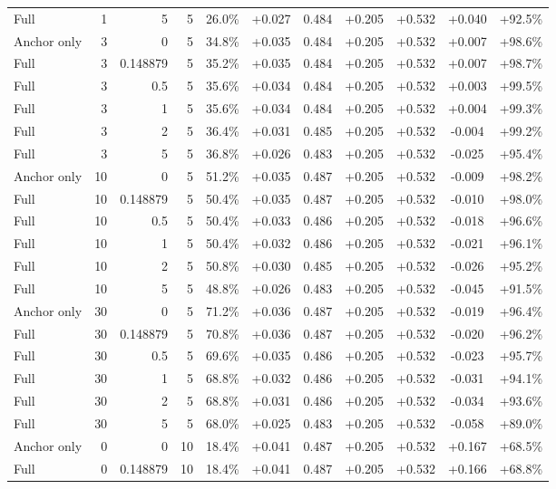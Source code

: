 \begin{table}[htbp]
\begin{tabular}{lrrrccccccc}
Full & 1 & 5 & 5 & 26.0\% & +0.027 & 0.484 & +0.205 & +0.532 & +0.040 & +92.5\% \\
Anchor only & 3 & 0 & 5 & 34.8\% & +0.035 & 0.484 & +0.205 & +0.532 & +0.007 & +98.6\% \\
Full & 3 & 0.148879 & 5 & 35.2\% & +0.035 & 0.484 & +0.205 & +0.532 & +0.007 & +98.7\% \\
Full & 3 & 0.5 & 5 & 35.6\% & +0.034 & 0.484 & +0.205 & +0.532 & +0.003 & +99.5\% \\
Full & 3 & 1 & 5 & 35.6\% & +0.034 & 0.484 & +0.205 & +0.532 & +0.004 & +99.3\% \\
Full & 3 & 2 & 5 & 36.4\% & +0.031 & 0.485 & +0.205 & +0.532 & -0.004 & +99.2\% \\
Full & 3 & 5 & 5 & 36.8\% & +0.026 & 0.483 & +0.205 & +0.532 & -0.025 & +95.4\% \\
Anchor only & 10 & 0 & 5 & 51.2\% & +0.035 & 0.487 & +0.205 & +0.532 & -0.009 & +98.2\% \\
Full & 10 & 0.148879 & 5 & 50.4\% & +0.035 & 0.487 & +0.205 & +0.532 & -0.010 & +98.0\% \\
Full & 10 & 0.5 & 5 & 50.4\% & +0.033 & 0.486 & +0.205 & +0.532 & -0.018 & +96.6\% \\
Full & 10 & 1 & 5 & 50.4\% & +0.032 & 0.486 & +0.205 & +0.532 & -0.021 & +96.1\% \\
Full & 10 & 2 & 5 & 50.8\% & +0.030 & 0.485 & +0.205 & +0.532 & -0.026 & +95.2\% \\
Full & 10 & 5 & 5 & 48.8\% & +0.026 & 0.483 & +0.205 & +0.532 & -0.045 & +91.5\% \\
Anchor only & 30 & 0 & 5 & 71.2\% & +0.036 & 0.487 & +0.205 & +0.532 & -0.019 & +96.4\% \\
Full & 30 & 0.148879 & 5 & 70.8\% & +0.036 & 0.487 & +0.205 & +0.532 & -0.020 & +96.2\% \\
Full & 30 & 0.5 & 5 & 69.6\% & +0.035 & 0.486 & +0.205 & +0.532 & -0.023 & +95.7\% \\
Full & 30 & 1 & 5 & 68.8\% & +0.032 & 0.486 & +0.205 & +0.532 & -0.031 & +94.1\% \\
Full & 30 & 2 & 5 & 68.8\% & +0.031 & 0.486 & +0.205 & +0.532 & -0.034 & +93.6\% \\
Full & 30 & 5 & 5 & 68.0\% & +0.025 & 0.483 & +0.205 & +0.532 & -0.058 & +89.0\% \\
Anchor only & 0 & 0 & 10 & 18.4\% & +0.041 & 0.487 & +0.205 & +0.532 & +0.167 & +68.5\% \\
Full & 0 & 0.148879 & 10 & 18.4\% & +0.041 & 0.487 & +0.205 & +0.532 & +0.166 & +68.8\% \\

\end{tabular}
\end{table}
